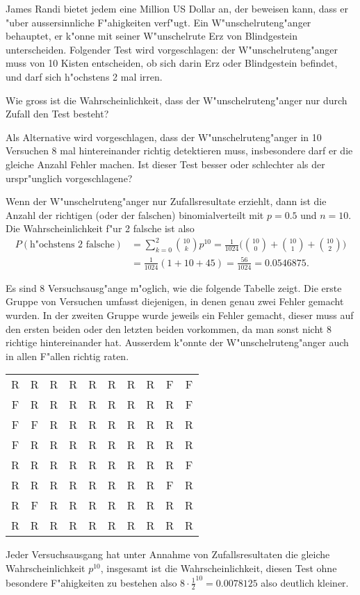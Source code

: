 James Randi bietet jedem eine Million US Dollar an, der beweisen kann,
dass er "uber aussersinnliche F"ahigkeiten verf"ugt. Ein W"unschelruteng"anger
behauptet, er k"onne mit seiner W"unschelrute Erz von Blindgestein
unterscheiden. Folgender Test wird vorgeschlagen: der W"unschelruteng"anger
muss von 10 Kisten entscheiden, ob sich darin Erz oder Blindgestein
befindet, und darf sich h"ochstens 2 mal irren.
\begin{teilaufgaben}
\item
Wie gross ist die
Wahrscheinlichkeit, dass der W"unschelruteng"anger nur durch Zufall
den Test besteht?
\item
Als Alternative wird vorgeschlagen, dass der W"unschelruteng"anger
in 10 Versuchen
8 mal hintereinander richtig detektieren muss, insbesondere darf
er die gleiche Anzahl Fehler machen.
Ist dieser Test
besser oder schlechter als der urspr"unglich vorgeschlagene?
\end{teilaufgaben}

\begin{loesung}
\begin{teilaufgaben}
\item Wenn der W"unschelruteng"anger nur Zufallsresultate erziehlt,
dann ist die Anzahl der richtigen (oder der falschen) binomialverteilt
mit $p=0.5$ und $n=10$. Die Wahrscheinlichkeit f"ur 2 falsche ist also
\begin{align*}
P(\text{h"ochstens 2 falsche})&=\sum_{k=0}^2 \binom{10}{k}p^{10}
=
\frac1{1024}\biggl(
\binom{10}{0}
+
\binom{10}{1}
+
\binom{10}{2}
\biggr)
\\
&=
\frac1{1024}( 1 + 10 + 45)
=\frac{56}{1024}=0.0546875.
\end{align*}
\item Es sind 8 Versuchsausg"ange m"oglich, wie die folgende Tabelle
zeigt. Die erste Gruppe von Versuchen umfasst diejenigen, in denen
genau zwei Fehler gemacht wurden. In der zweiten Gruppe wurde jeweils
ein Fehler gemacht, dieser muss auf den ersten beiden oder den letzten
beiden vorkommen, da man sonst nicht 8 richtige hintereinander hat.
Ausserdem k"onnte der W"unschelruteng"anger auch in allen F"allen richtig
raten.
\begin{center}
\begin{tabular}{cccccccccc}
R&R&R&R&R&R&R&R&F&F\\
F&R&R&R&R&R&R&R&R&F\\
F&F&R&R&R&R&R&R&R&R\\
\hline
F&R&R&R&R&R&R&R&R&R\\
R&R&R&R&R&R&R&R&R&F\\
R&R&R&R&R&R&R&R&F&R\\
R&F&R&R&R&R&R&R&R&R\\
\hline
R&R&R&R&R&R&R&R&R&R
\end{tabular}
\end{center}
Jeder Versuchsausgang hat unter Annahme von Zufallsresultaten die gleiche
Wahrscheinlichkeit
$p^{10}$, insgesamt ist die Wahrscheinlichkeit, diesen Test ohne
besondere F"ahigkeiten zu bestehen also $8\cdot \frac12^{10}=0.0078125$
also deutlich kleiner.
\end{teilaufgaben}
\end{loesung}

